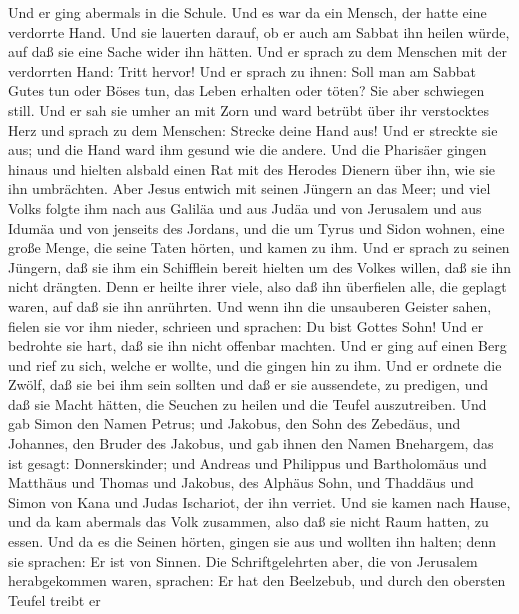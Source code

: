  Und er ging abermals in die Schule. Und es war da ein
Mensch, der hatte eine verdorrte Hand.  Und sie lauerten
darauf, ob er auch am Sabbat ihn heilen würde, auf daß sie eine Sache
wider ihn hätten.  Und er sprach zu dem Menschen mit der
verdorrten Hand: Tritt hervor!  Und er sprach zu ihnen: Soll
man am Sabbat Gutes tun oder Böses tun, das Leben erhalten oder töten?
Sie aber schwiegen still.  Und er sah sie umher an mit Zorn
und ward betrübt über ihr verstocktes Herz und sprach zu dem Menschen:
Strecke deine Hand aus! Und er streckte sie aus; und die Hand ward ihm
gesund wie die andere.  Und die Pharisäer gingen hinaus und
hielten alsbald einen Rat mit des Herodes Dienern über ihn, wie sie ihn
umbrächten.  Aber Jesus entwich mit seinen Jüngern an das
Meer; und viel Volks folgte ihm nach aus Galiläa und aus Judäa
 und von Jerusalem und aus Idumäa und von jenseits des
Jordans, und die um Tyrus und Sidon wohnen, eine große Menge, die seine
Taten hörten, und kamen zu ihm.  Und er sprach zu seinen
Jüngern, daß sie ihm ein Schifflein bereit hielten um des Volkes willen,
daß sie ihn nicht drängten.  Denn er heilte ihrer viele,
also daß ihn überfielen alle, die geplagt waren, auf daß sie ihn
anrührten.  Und wenn ihn die unsauberen Geister sahen,
fielen sie vor ihm nieder, schrieen und sprachen: Du bist Gottes Sohn!
 Und er bedrohte sie hart, daß sie ihn nicht offenbar
machten.  Und er ging auf einen Berg und rief zu sich,
welche er wollte, und die gingen hin zu ihm.  Und er
ordnete die Zwölf, daß sie bei ihm sein sollten und daß er sie
aussendete, zu predigen,  und daß sie Macht hätten, die
Seuchen zu heilen und die Teufel auszutreiben.  Und gab
Simon den Namen Petrus;  und Jakobus, den Sohn des
Zebedäus, und Johannes, den Bruder des Jakobus, und gab ihnen den Namen
Bnehargem, das ist gesagt: Donnerskinder;  und Andreas und
Philippus und Bartholomäus und Matthäus und Thomas und Jakobus, des
Alphäus Sohn, und Thaddäus und Simon von Kana  und Judas
Ischariot, der ihn verriet.  Und sie kamen nach Hause, und
da kam abermals das Volk zusammen, also daß sie nicht Raum hatten, zu
essen.  Und da es die Seinen hörten, gingen sie aus und
wollten ihn halten; denn sie sprachen: Er ist von Sinnen. 
Die Schriftgelehrten aber, die von Jerusalem herabgekommen waren,
sprachen: Er hat den Beelzebub, und durch den obersten Teufel treibt er
